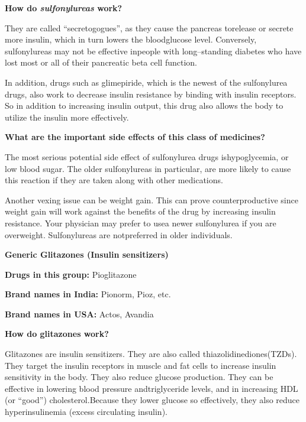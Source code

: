 \vskip 4pt

\noindent\textbf{How do \textit{sulfonylureas} work?}
\vskip 4pt

They are called “secretogogues”, as they cause the pancreas to\break release or secrete more insulin, which in turn lowers the blood\break glucose level. Conversely, sulfonylureas may not be effective in\break people with long–standing diabetes who have lost most or all of their pancreatic beta cell function.

In addition, drugs such as glimepiride, which is the newest of the sulfonylurea drugs, also work to decrease insulin resistance by binding with insulin receptors. So in addition to increasing insulin output, this drug also allows the body to utilize the insulin more effectively.

\vskip 4pt

\noindent\textbf{What are the important side effects of this class of medicines?}
\vskip 4pt

The most serious potential side effect of sulfonylurea drugs is\break hypoglycemia, or low blood sugar. The older sulfonylureas in parti\-cular, are more likely to cause this reaction if they are taken along with other medications.

Another vexing issue can be weight gain. This can prove counter\-productive since weight gain will work against the benefits of the drug by increasing insulin resistance. Your physician may prefer to use\break a newer sulfonylurea if you are overweight. Sulfonylureas are not\break pre\-ferred in older individuals.

\vskip 6pt

\textbf{Generic Glitazones (Insulin sensitizers)}
\vskip 3pt

\textbf{Drugs in this group:} Pioglitazone

\textbf{Brand names in India:} Pionorm, Pioz, etc.

\textbf{Brand names in USA:} Actos, Avandia

\vskip 5pt

\noindent\textbf{How do glitazones work?}
\vskip 3pt

Glitazones are insulin sensitizers. They are also called thiazolidinediones(TZDs). They target the insulin receptors in muscle and fat cells to increase insulin sensitivity in the body. They also reduce glucose production. They can be effective in lowering blood pressure and\break triglyceride levels, and in increasing HDL (or “good”) cholesterol.\break Because they lower glucose so effectively, they also reduce hyper\-insu\-linemia (excess circulating insulin).

